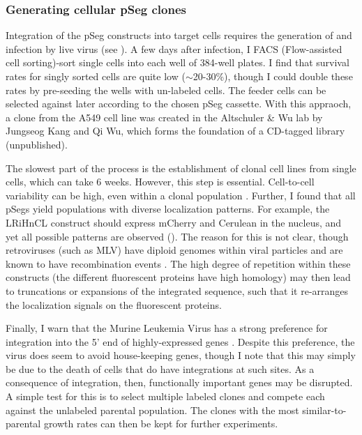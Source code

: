 \subsubsection{Generating cellular pSeg clones}


Integration of the pSeg constructs into target
cells requires the generation of and infection by
live virus (see ). A few days
after infection, I FACS (Flow-assisted cell sorting)-sort
single cells into each well of 384-well
plates. I find that survival rates
for singly sorted cells are quite low ($\sim$20-30\%), though
I could double these rates by pre-seeding the
wells with un-labeled cells. The feeder cells can
be selected against later according to the chosen pSeg cassette.
With this appraoch, a clone from the A549 cell line was created in the
Altschuler \& Wu lab by Jungseog Kang and Qi Wu, which
forms the foundation of a CD-tagged library (unpublished).


The slowest part of the process is the establishment of clonal
cell lines from single cells, which can take 6 weeks.
However, this step is essential.
Cell-to-cell variability can be high, even within
a clonal population \cite{Singh2010}. Further, I found that all
pSegs yield populations with diverse localization patterns.
For example, the LRiHnCL construct should express
mCherry and Cerulean in the nucleus, and yet all
possible patterns are observed ().
The reason for this is not clear, though retroviruses
(such as MLV) have diploid genomes within viral
particles and are known to have recombination events
\cite{Coffin1997}. The high degree of repetition within
these constructs (the different fluorescent proteins
have high homology) may then lead to truncations or
expansions of the integrated sequence, such that it
re-arranges the localization signals on the fluorescent
proteins.


Finally, I warn that the Murine Leukemia Virus has
a strong preference for integration into the 5' end
of highly-expressed genes
\cite{Wu2003a,Mitchell2004,Cattoglio2010}. Despite this
preference, the virus does seem to
avoid house-keeping genes, though I note that this
may simply be due to the death of cells that do have
integrations at such sites. As a consequence of integration,
then, functionally important genes may be disrupted. A simple test for
this is to select multiple labeled clones and compete each
against the unlabeled parental population. The clones with the
most similar-to-parental growth rates can then be kept for further experiments. 



